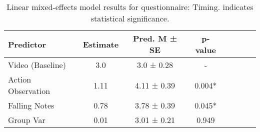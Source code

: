 
    \begin{table}[H]
    \centering
    \begin{small}
    \begin{tabular}{lccccccc}
\toprule
Predictor & Estimate & Pred. M ± SE & p-value \\
\midrule
Video (Baseline) & 3.0 & 3.0 ± 0.28 & - \\
Action Observation & 1.11 & 4.11 ± 0.39 & 0.004* \\
Falling Notes & 0.78 & 3.78 ± 0.39 & 0.045* \\
Group Var & 0.01 & 3.01 ± 0.21 & 0.949 \\
\bottomrule
\end{tabular}

    \end{small}
    \caption[Linear mixed-effects model results for questionnaire: Note Timing]{Linear mixed-effects model results for questionnaire: Timing. \newline * indicates statistical significance.}
    \label{tab:differentiation}
    \end{table}